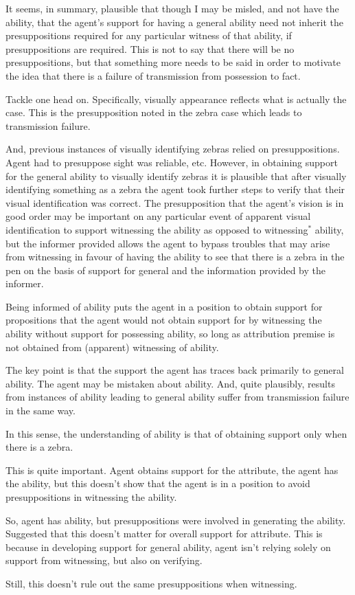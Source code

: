 \documentclass[10pt]{article}
\newcommand{\nf}[1]{#1\ensuremath{^{{*}}}}
\begin{document}
\begin{note}
  It seems, in summary, plausible that though I may be misled, and not have the ability, that the agent's support for having a general ability need not inherit the presuppositions required for any particular witness of that ability, if presuppositions are required.
  This is not to say that there will be no presuppositions, but that something more needs to be said in order to motivate the idea that there is a failure of transmission from possession to fact.

  Tackle one head on.
  Specifically, visually appearance reflects what is actually the case.
  This is the presupposition noted in the zebra case which leads to transmission failure.

  And, previous instances of visually identifying zebras relied on presuppositions.
  Agent had to presuppose sight was reliable, etc.
  However, in obtaining support for the general ability to visually identify zebras it is plausible that after visually identifying something as a zebra the agent took further steps to verify that their visual identification was correct.
  The presupposition that the agent's vision is in good order may be important on any particular event of apparent visual identification to support witnessing the ability as opposed to \nf{witnessing} ability, but the informer provided allows the agent to bypass troubles that may arise from witnessing in favour of having the ability to see that there is a zebra in the pen on the basis of support for general and the information provided by the informer.
\end{note}

\begin{note}
  Being informed of ability puts the agent in a position to obtain support for propositions that the agent would not obtain support for by witnessing the ability without support for possessing ability, so long as attribution premise is not obtained from (apparent) witnessing of ability.

  The key point is that the support the agent has traces back primarily to general ability.
  The agent may be mistaken about ability.
  And, quite plausibly, results from instances of ability leading to general ability suffer from transmission failure in the same way.

  In this sense, the understanding of ability is that of obtaining support only when there is a zebra.

  This is quite important.
  Agent obtains support for the attribute, the agent has the ability, but this doesn't show that the agent is in a position to avoid presuppositions in witnessing the ability.

  So, agent has ability, but presuppositions were involved in generating the ability.
  Suggested that this doesn't matter for overall support for attribute.
  This is because in developing support for general ability, agent isn't relying solely on support from witnessing, but also on verifying.

  Still, this doesn't rule out the same presuppositions when witnessing.
\end{note}
\end{document}
